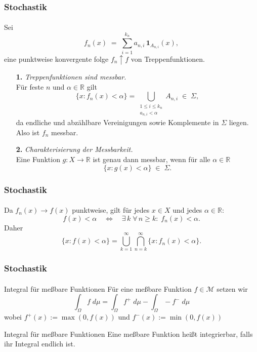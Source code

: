 \documentclass{beamer}
\begin{document}
\begin{frame}
    \frametitle{Stochastik}
\framesubtitle{}
Sei 
\[
  f_n(x) \;=\; \sum_{i=1}^{k_n} a_{n,i}\,\mathbf{1}_{A_{n,i}}(x),
\]
 eine punktweise konvergente folge $f_n \uparrow f$ von Treppenfunktionen.

\begin{enumerate}
    \item[\textbf{1.}] \emph{Treppenfunktionen sind messbar.} \\
      Für feste $n$ und $\alpha\in\mathbb{R}$ gilt
      \[
        \{x: f_n(x)<\alpha\}
        = \bigcup_{\substack{1\le i\le k_n \\ a_{n,i}<\alpha}} A_{n,i}
        \;\in\;\Sigma,
      \]
      da endliche und abzählbare Vereinigungen sowie Komplemente in $\Sigma$ liegen. Also ist $f_n$ messbar.
  
    \item[\textbf{2.}] \emph{Charakterisierung der Messbarkeit.} \\
      Eine Funktion $g\colon X\to\mathbb{R}$ ist genau dann messbar, wenn für alle $\alpha\in\mathbb{R}$
      \[
        \{x:g(x)<\alpha\}\;\in\;\Sigma.
      \]
  
    
     
    \end{enumerate}
    \end{frame}

    \begin{frame}
        \frametitle{Stochastik}
    \framesubtitle{}
       Da $f_n(x)\to f(x)$ punktweise, gilt für jedes $x\in X$ und jedes $\alpha\in\mathbb{R}$:
      \[
        f(x)<\alpha
        \quad\Longleftrightarrow\quad
        \exists\,k\;\forall\,n\ge k:\;f_n(x)<\alpha.
      \]
    Daher
    \[
      \{x:f(x)<\alpha\}
      = \bigcup_{k=1}^{\infty}\bigcap_{n=k}^{\infty}\{x:f_n(x)<\alpha\}.
    \]

\end{frame}
 



\begin{frame}
    \frametitle{Stochastik}
\framesubtitle{}
    \begin{block}{Integral für meßbare Funktionen}
        Für eine meßbare Funktion  $f \in \mathcal{M}$ setzen wir
        $$ \int_{\Omega} f \; d\mu = \int_{\Omega}f^+ \; d\mu  - \int_{\Omega}-f^- \; d\mu$$
        wobei $f^+(x) := \max (0, f(x))$ und $f^-(x) := \min (0, f(x))$
    \end{block}

    \begin{block}{Integral für meßbare Funktionen}
       Eine meßbare Funktion heißt integrierbar, falls ihr Integral endlich ist.
    \end{block}

\end{frame}
\end{document}
